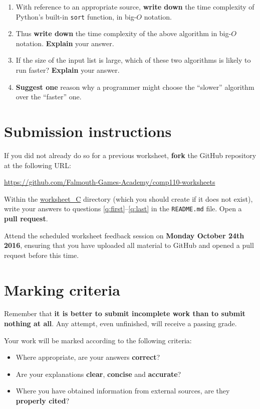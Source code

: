 \documentclass{../../../fal_assignment}
\begin{document}
\begin{enumerate}[resume,label=(\alph*)]
	\item With reference to an appropriate source, \textbf{write down} the time complexity of Python's built-in
		\lstinline{sort} function, in big-$O$ notation.
	\item Thus \textbf{write down} the time complexity of the above algorithm in big-$O$ notation.
		\textbf{Explain} your answer.
	\item If the size of the input list is large, which of these two algorithms is likely to run faster?
		\textbf{Explain} your answer.
	\item \textbf{Suggest one} reason why a programmer might choose the ``slower'' algorithm
		over the ``faster'' one.
	\label{q:last}
\end{enumerate}

\section*{Submission instructions}

If you did not already do so for a previous worksheet, \textbf{fork} the GitHub repository at the following URL:

\url{https://github.com/Falmouth-Games-Academy/comp110-worksheets}

Within the \url{worksheet_C} directory (which you should create if it does not exist),
write your answers to questions \ref{q:first}--\ref{q:last} in the \texttt{README.md} file.
Open a \textbf{pull request}.

Attend the scheduled worksheet feedback session on \textbf{Monday October 24th 2016},
ensuring that you have uploaded all material to GitHub and opened a pull request before this time.

\section*{Marking criteria}

Remember that \textbf{it is better to submit incomplete work than to submit nothing at all}.
Any attempt, even unfinished, will receive a passing grade.

Your work will be marked according to the following criteria:
\begin{itemize}
	\item Where appropriate, are your answers \textbf{correct}?
	\item Are your explanations \textbf{clear}, \textbf{concise} and \textbf{accurate}?
	\item Where you have obtained information from external sources, are they \textbf{properly cited}?
\end{itemize}
\end{document}
